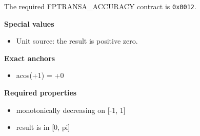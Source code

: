 The required FPTRANSA\_ACCURACY contract is \texttt{0x0012}.

\textbf{Special values}\par
\begin{itemize}
\item Unit source: the result is positive zero.
\end{itemize}

\textbf{Exact anchors}\par
\begin{itemize}
\item acos(+1) = +0
\end{itemize}

\textbf{Required properties}\par
\begin{itemize}
\item monotonically decreasing on [-1, 1]
\item result is in [0, pi]
\end{itemize}
